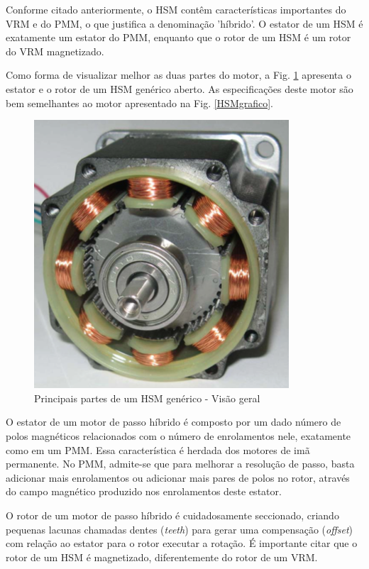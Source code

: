	Conforme citado anteriormente, o HSM contêm características importantes do VRM e do PMM, o que justifica a denominação 'híbrido'. O estator de um HSM é exatamente um estator do PMM, enquanto que o rotor de um HSM é um rotor do VRM magnetizado.
	
	Como forma de visualizar melhor as duas partes do motor, a Fig. \ref{HSMreal} apresenta o estator e o rotor de um HSM genérico aberto. As especificações deste motor são bem semelhantes ao motor apresentado na Fig. \ref{HSMgrafico}.
	
	\begin{figure}[!h]
		\centering
		\includegraphics[scale=.45]{Images/hsmreal1.png}
		\caption{Principais partes de um HSM genérico - Visão geral \cite{ieeeRusso}}
		\label{HSMreal}
	\end{figure} 
	
	O estator de um motor de passo híbrido é composto por um dado número de polos magnéticos relacionados com o número de enrolamentos nele, exatamente como em um PMM. Essa característica é herdada dos motores de imã permanente. No PMM, admite-se que para melhorar a resolução de passo, basta adicionar mais enrolamentos ou adicionar mais pares de polos no rotor, através do campo magnético produzido nos enrolamentos deste estator. 
	
	O rotor de um motor de passo híbrido é cuidadosamente seccionado, criando pequenas lacunas chamadas dentes (\textit{teeth}) para gerar uma compensação (\textit{offset}) com relação ao estator para o rotor executar a rotação. É importante citar que o rotor de um HSM é magnetizado, diferentemente do rotor de um VRM.
	
